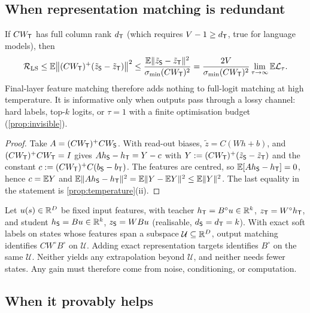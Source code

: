 \subsection{When representation matching is redundant}

\begin{proposition}\label{prop:lastlayer}
 If $CW_{\mathsf{T}}$ has full column rank $d_{\mathsf{T}}$ (which requires $V-1\ge d_{\mathsf{T}}$, true for
language models), then
\[
\mathcal{R}_{\mathrm{LS}}\le\mathbb{E}\big\|(CW_{\mathsf{T}})^+(\tilde z_{\mathsf{S}}-\tilde z_{\mathsf{T}})\big\|^2\le\frac{\mathbb{E}\|\tilde z_{\mathsf{S}}-\tilde z_{\mathsf{T}}\|^2}{\sigma_{\min}(CW_{\mathsf{T}})^2}
=\frac{2V}{\sigma_{\min}(CW_{\mathsf{T}})^2}\lim_{\tau\to\infty}\mathbb{E}\mathcal{L}_\tau .
\]
Final-layer feature matching therefore adds nothing to full-logit matching at high temperature. It is
informative only when outputs pass through a lossy channel: hard labels, top-$k$ logits, or $\tau=1$ with
a finite optimisation budget (\cref{prop:invisible}).
\end{proposition}
\begin{proof}
Take $A=(CW_{\mathsf{T}})^+CW_{\mathsf{S}}$. With read-out biases, $\tilde z=C(Wh+b)$, and $(CW_{\mathsf{T}})^+CW_{\mathsf{T}}=I$ gives
$Ah_{\mathsf{S}}-h_{\mathsf{T}}=Y-c$ with $Y:=(CW_{\mathsf{T}})^+(\tilde z_{\mathsf{S}}-\tilde z_{\mathsf{T}})$ and the constant $c:=(CW_{\mathsf{T}})^+C(b_{\mathsf{S}}-b_{\mathsf{T}})$. The features
are centred, so $\mathbb{E}[Ah_{\mathsf{S}}-h_{\mathsf{T}}]=0$, hence $c=\mathbb{E} Y$ and $\mathbb{E}\|Ah_{\mathsf{S}}-h_{\mathsf{T}}\|^2=\mathbb{E}\|Y-\mathbb{E} Y\|^2\le\mathbb{E}\|Y\|^2$. The last equality in
the statement is \cref{prop:temperature}(ii).
\end{proof}

\begin{proposition}\label{prop:noidgain}
\Mo Let $u(s)\in\mathbb{R}^D$ be fixed input features, with teacher $h_{\mathsf{T}}=B^\circ u\in\mathbb{R}^k$, $z_{\mathsf{T}}=W^\circ h_{\mathsf{T}}$, and student
$h_{\mathsf{S}}=Bu\in\mathbb{R}^k$, $z_{\mathsf{S}}=WBu$ (realisable, $d_{\mathsf{S}}=d_{\mathsf{T}}=k$). With exact soft labels on states whose features span a subspace
$\mathcal U\subseteq\mathbb{R}^D$, output matching identifies $CW^\circ B^\circ$ on $\mathcal U$. Adding exact representation
targets identifies $B^\circ$ on the same $\mathcal U$. Neither yields any extrapolation beyond $\mathcal U$, and
neither needs fewer states. Any gain must therefore come from noise, conditioning, or computation.
\end{proposition}

\subsection{When it provably helps}

